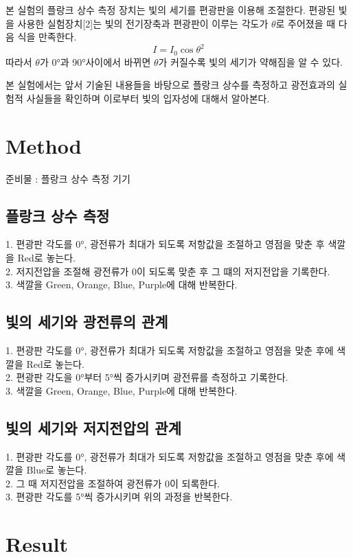 \documentclass[a4paper]{article}
\begin{document}
	본 실험의 플랑크 상수 측정 장치는 빛의 세기를 편광판을 이용해 조절한다.
	편광된 빛을 사용한 실험장치[2]는 빛의 전기장축과 편광판이 이루는 각도가 $\theta$로 주어졌을 때 다음 식을 만족한다.
	\begin{equation}
		I = I_{0}\cos{\theta}^{2}
		\label{eq:polar}
	\end{equation}
	따라서 $\theta$가 \ang{0}과 \ang{90}사이에서 바뀌면 $\theta$가 커질수록 빛의 세기가 약해짐을 알 수 있다.

	본 실험에서는 앞서 기술된 내용들을 바탕으로 플랑크 상수를 측정하고 광전효과의 실험적 사실들을 확인하며 이로부터 빛의 입자성에 대해서 알아본다.

\section{Method}
	준비물 : 플랑크 상수 측정 기기
	\subsection{플랑크 상수 측정}
		1. 편광판 각도를 \ang{0}, 광전류가 최대가 되도록 저항값을 조절하고 영점을 맞춘 후 색깔을 Red로 놓는다. \\
		2. 저지전압을 조절해 광전류가 0이 되도록 맞춘 후 그 떄의 저지전압을 기록한다. \\
		3. 색깔을 Green, Orange, Blue, Purple에 대해 반복한다.

	\subsection{빛의 세기와 광전류의 관계}
		1. 편광판 각도를 \ang{0}, 광전류가 최대가 되도록 저항값을 조절하고 영점을 맞춘 후에 색깔을 Red로 놓는다. \\
		2. 편광판 각도을 \ang{0}부터 \ang{5}씩 증가시키며 광전류를 측정하고 기록한다. \\
		3. 색깔을 Green, Orange, Blue, Purple에 대해 반복한다.

	\subsection{빛의 세기와 저지전압의 관계}
		1. 편광판 각도를 \ang{0}, 광전류가 최대가 되도록 저항값을 조절하고 영점을 맞춘 후에 색깔을 Blue로 놓는다. \\
		2. 그 때 저지전압을 조절하여 광전류가 0이 되록한다. \\
		3. 편광판 각도를 \ang{5}씩 증가시키며 위의 과정을 반복한다. 

\section{Result}
\end{document}
